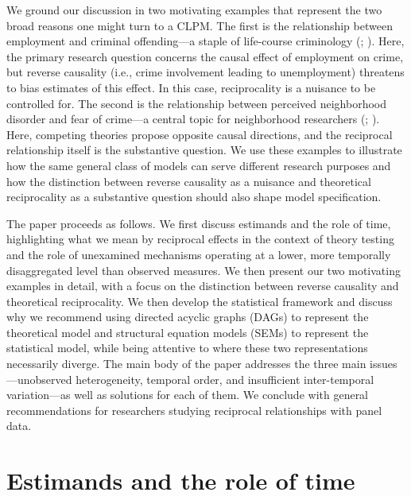 \documentclass[
  letterpaper,
  DIV=11,
  numbers=noendperiod]{scrartcl}
\begin{document}
We ground our discussion in two motivating examples that represent the
two broad reasons one might turn to a CLPM. The first is the
relationship between employment and criminal offending---a staple of
life-course criminology (; ). Here,
the primary research question concerns the causal effect of employment
on crime, but reverse causality (i.e., crime involvement leading to
unemployment) threatens to bias estimates of this effect. In this case,
reciprocality is a nuisance to be controlled for. The second is the
relationship between perceived neighborhood disorder and fear of
crime---a central topic for neighborhood researchers
(;
).
Here, competing theories propose opposite causal directions, and the
reciprocal relationship itself is the substantive question. We use these
examples to illustrate how the same general class of models can serve
different research purposes and how the distinction between reverse
causality as a nuisance and theoretical reciprocality as a substantive
question should also shape model specification.

The paper proceeds as follows. We first discuss estimands and the role
of time, highlighting what we mean by reciprocal effects in the context
of theory testing and the role of unexamined mechanisms operating at a
lower, more temporally disaggregated level than observed measures. We
then present our two motivating examples in detail, with a focus on the
distinction between reverse causality and theoretical reciprocality. We
then develop the statistical framework and discuss why we recommend
using directed acyclic graphs (DAGs) to represent the theoretical model
and structural equation models (SEMs) to represent the statistical
model, while being attentive to where these two representations
necessarily diverge. The main body of the paper addresses the three main
issues---unobserved heterogeneity, temporal order, and insufficient
inter-temporal variation---as well as solutions for each of them. We
conclude with general recommendations for researchers studying
reciprocal relationships with panel data.

\section{Estimands and the role of
time}\label{estimands-and-the-role-of-time}
\end{document}
